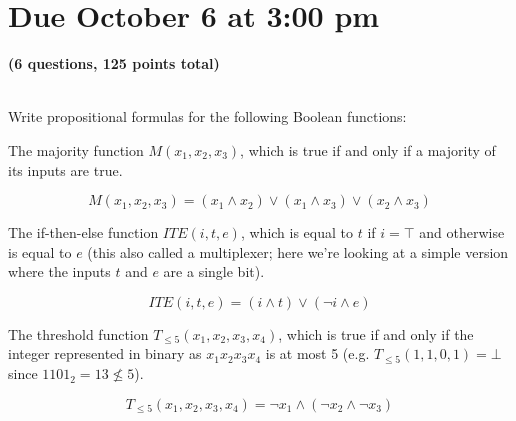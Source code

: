 \documentclass[11pt]{article}
\begin{document}
\maketitle
\def\ceil#1{\lceil #1 \rceil}
\def\floor#1{\lfloor #1 \rfloor}
\section*{Due October 6 at 3:00 pm}

\textbf{(6 questions, 125 points total)}

\begin{qunlist}
  \\
  Write propositional formulas for the following Boolean functions:
  \begin{qparts}
  \item
    The majority function $M(x_1,x_2,x_3)$, which is true if and only if a majority of its inputs are true.

    \begin{answer}

      \begin{equation}
        M(x_1,x_2,x_3) = (x_1 \land x_2) \lor (x_1 \land x_3) \lor (x_2 \land x_3)
      \end{equation}

    \end{answer}

  \item
    The if-then-else function $ITE(i, t, e)$, which is equal to $t$ if $i = \top$ and otherwise is equal to $e$ (this also called a multiplexer; here we're looking at a simple version where the inputs $t$ and $e$ are a single bit).

    \begin{answer}
      \begin{equation}
        ITE(i, t, e) = (i \land t) \lor (\lnot i \land e)
      \end{equation}
    \end{answer}

  \item
    The threshold function $T_{\le 5}(x_1,x_2,x_3,x_4)$, which is true if and only if the integer represented in binary as $x_1 x_2 x_3 x_4$ is at most 5 (e.g. $T_{\le 5}(1,1,0,1) = \bot$ since $1101_2 = 13 \not \le 5$).

    \begin{answer}
      \begin{equation}
        T_{\le 5}(x_1,x_2,x_3,x_4) = \neg x_1\land (\neg x_2 \land \neg x_3)
      \end{equation}


\end{answer}
\end{qparts}
\end{qunlist}
\end{document}
